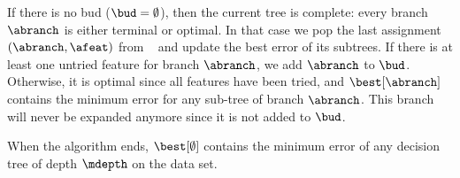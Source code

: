 \documentclass{llncs}
\begin{document}
If there is no bud ($\bud = \emptyset$), then the current tree is complete: every branch $\abranch$ is either terminal or optimal. In that case we pop the last assignment $(\abranch,\afeat)$ from \sequence\ 
and update the best error of its subtrees. If there is at least one untried feature for branch $\abranch$, we add $\abranch$ to $\bud$.
Otherwise, it is optimal since all features have been tried, and $\best[\abranch]$ contains the minimum error for any sub-tree of branch $\abranch$. 
This branch will never be expanded anymore since it is not added to $\bud$.

When the algorithm ends, $\best[\emptyset]$ contains the minimum error of any decision tree of depth $\mdepth$ on the data set.


%
%
%
\end{document}
